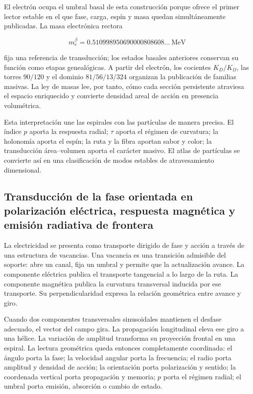 El electrón ocupa el umbral basal de esta construcción porque ofrece el primer lector estable en el que fase, carga, espín y masa quedan simultáneamente publicadas. La masa electrónica rectora

\[
m_e^\beta=0.510998950690000808608\ldots\ \mathrm{MeV}
\]

fija una referencia de transducción; los estados basales anteriores conservan su función como etapas genealógicas. A partir del electrón, los cocientes \(K_D/K_\Omega\), las torres \(90/120\) y el dominio \(81/56/13/324\) organizan la publicación de familias masivas. La ley de masas lee, por tanto, cómo cada sección persistente atraviesa el espacio enriquecido y convierte densidad areal de acción en presencia volumétrica.

Esta interpretación une las espirales con las partículas de manera precisa. El índice \(p\) aporta la respuesta radial; \(\tau\) aporta el régimen de curvatura; la holonomía aporta el espín; la ruta y la fibra aportan sabor y color; la transducción área–volumen aporta el carácter masivo. El atlas de partículas se convierte así en una clasificación de modos estables de atravesamiento dimensional.

\subsection{Transducción de la fase orientada en polarización eléctrica, respuesta magnética y emisión radiativa de frontera}

La electricidad se presenta como transporte dirigido de fase y acción a través de una estructura de vacancias. Una vacancia es una transición admisible del soporte: abre un canal, fija un umbral y permite que la actualización avance. La componente eléctrica publica el transporte tangencial a lo largo de la ruta. La componente magnética publica la curvatura transversal inducida por ese transporte. Su perpendicularidad expresa la relación geométrica entre avance y giro.

Cuando dos componentes transversales sinusoidales mantienen el desfase adecuado, el vector del campo gira. La propagación longitudinal eleva ese giro a una hélice. La variación de amplitud transforma su proyección frontal en una espiral. La lectura geométrica queda entonces completamente coordinada: el ángulo porta la fase; la velocidad angular porta la frecuencia; el radio porta amplitud y densidad de acción; la orientación porta polarización y sentido; la coordenada vertical porta propagación y memoria; \(p\) porta el régimen radial; el umbral porta emisión, absorción o cambio de estado.

